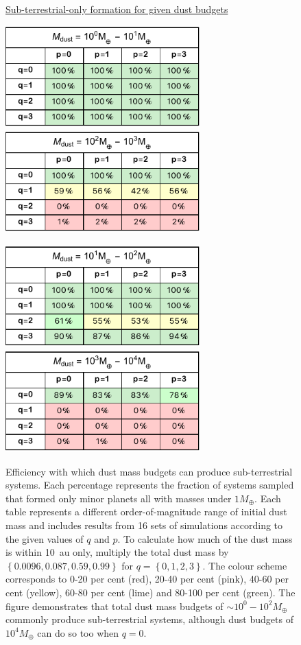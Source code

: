 \documentclass[useAMS,usenatbib]{mn2e}
\begin{document}
\begin{figure}
\centerline{\Huge \underline{Sub-terrestrial-only formation for given dust budgets}}
\centerline{}
\centerline{}
\centerline{
\includegraphics[width=7.5cm]{PlotTable0top1} \ \ \ \ \ \ \
\includegraphics[width=7.5cm]{PlotTablep2top3}
}
\centerline{}
\centerline{
\includegraphics[width=7.5cm]{PlotTablep1top2} \ \ \ \ \ \ \
\includegraphics[width=7.5cm]{PlotTablep3top4}
}
\caption{
Efficiency with which dust mass budgets can produce sub-terrestrial systems. Each percentage represents the fraction of systems sampled that formed only minor planets all with masses under $1M_{\oplus}$. Each table represents a different order-of-magnitude range of initial dust mass and includes results from 16 sets of simulations according to the given values of $q$ and $p$. To calculate how much of the dust mass is within 10~au only, multiply the total dust mass by $\left\lbrace 0.0096, 0.087, 0.59, 0.99 \right\rbrace$ for $q=\left\lbrace 0,1,2,3\right\rbrace$. The colour scheme corresponds to 0-20 per cent (red), 20-40 per cent (pink), 40-60 per cent (yellow), 60-80 per cent (lime) and 80-100 per cent (green). The figure demonstrates that total dust mass budgets of $\sim 10^{0}-10^{2}M_{\oplus}$ commonly produce sub-terrestrial systems, although dust budgets of $10^{4}M_{\oplus}$ can do so too when $q=0$.
}
\label{FigTables}
\end{figure}
\end{document}
